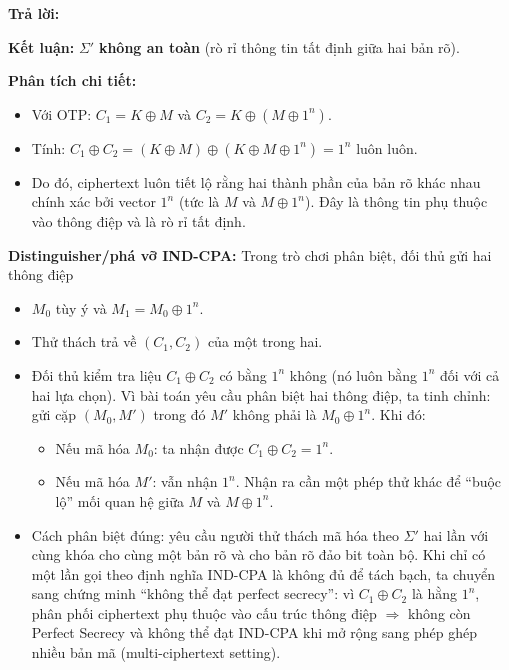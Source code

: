 \begin{center}
\textbf{Trả lời:}
\end{center}

\textbf{Kết luận:} $\Sigma'$ \textbf{không an toàn} (rò rỉ thông tin tất định giữa hai bản rõ).

\textbf{Phân tích chi tiết:}
\begin{itemize}
    \item Với OTP: $C_1 = K \oplus M$ và $C_2 = K \oplus (M \oplus 1^n)$.
    \item Tính: $C_1 \oplus C_2 = (K \oplus M) \oplus (K \oplus M \oplus 1^n) = 1^n$ luôn luôn.
    \item Do đó, ciphertext luôn tiết lộ rằng hai thành phần của bản rõ khác nhau chính xác bởi vector $1^n$ (tức là $M$ và $M \oplus 1^n$). Đây là thông tin phụ thuộc vào thông điệp và là rò rỉ tất định.
\end{itemize}

\textbf{Distinguisher/phá vỡ IND-CPA:} Trong trò chơi phân biệt, đối thủ gửi hai thông điệp
\begin{itemize}
    \item $M_0$ tùy ý và $M_1 = M_0 \oplus 1^n$.
    \item Thử thách trả về $(C_1,C_2)$ của một trong hai.
    \item Đối thủ kiểm tra liệu $C_1 \oplus C_2$ có bằng $1^n$ không (nó luôn bằng $1^n$ đối với cả hai lựa chọn). Vì bài toán yêu cầu phân biệt hai thông điệp, ta tinh chỉnh: gửi cặp $(M_0, M')$ trong đó $M'$ không phải là $M_0 \oplus 1^n$. Khi đó:
    \begin{itemize}
        \item Nếu mã hóa $M_0$: ta nhận được $C_1 \oplus C_2 = 1^n$.
        \item Nếu mã hóa $M'$: vẫn nhận $1^n$. Nhận ra cần một phép thử khác để ``buộc lộ'' mối quan hệ giữa $M$ và $M \oplus 1^n$.
    \end{itemize}
    \item Cách phân biệt đúng: yêu cầu người thử thách mã hóa theo $\Sigma'$ hai lần với cùng khóa cho cùng một bản rõ và cho bản rõ đảo bit toàn bộ. Khi chỉ có một lần gọi theo định nghĩa IND-CPA là không đủ để tách bạch, ta chuyển sang chứng minh ``không thể đạt perfect secrecy'': vì $C_1 \oplus C_2$ là hằng $1^n$, phân phối ciphertext phụ thuộc vào cấu trúc thông điệp $\Rightarrow$ không còn Perfect Secrecy và không thể đạt IND-CPA khi mở rộng sang phép ghép nhiều bản mã (multi-ciphertext setting).
\end{itemize}

